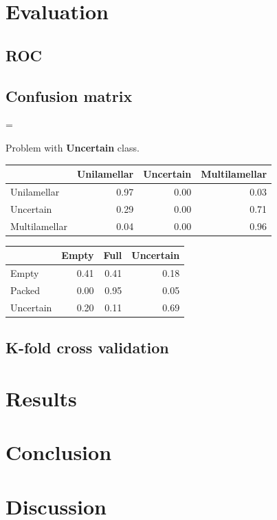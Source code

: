 \documentclass[a4paper, 11pt, table]{article}
\newenvironment{warning}
  {\par\begin{mdframed}[linewidth=2pt,linecolor=red]%
    \begin{list}{}{\leftmargin=1cm
                   \labelwidth=\leftmargin}\item[\Large\ding{43}]}
  {\end{list}\end{mdframed}\par}
\begin{document}
\begin{landscape}
\end{landscape}

\section{Evaluation}

\subsection{ROC}

\subsection{Confusion matrix}

\begin{warning}
Problem with \textbf{Uncertain} class.
\end{warning}

\begin{center}
\begin{tabular}{lrrr}
\hline
 & Unilamellar & Uncertain & Multilamellar \\ 
\hline 
Unilamellar & 0.97 & 0.00 & 0.03 \\ 
Uncertain & 0.29 & 0.00 & 0.71 \\ 
Multilamellar & 0.04 & 0.00 & 0.96 \\ 
\end{tabular} 
\end{center}

\begin{center}
\begin{tabular}{lrrr}
\hline
 & Empty & Full & Uncertain \\ 
\hline 
Empty & 0.41 & 0.41 & 0.18 \\ 
Packed & 0.00 & 0.95 & 0.05 \\ 
Uncertain & 0.20 & 0.11 & 0.69 \\ 
\end{tabular} 
\end{center}

\subsection{K-fold cross validation}

\section{Results}

\section{Conclusion}

\section{Discussion}

\printbibliography
\end{document}
